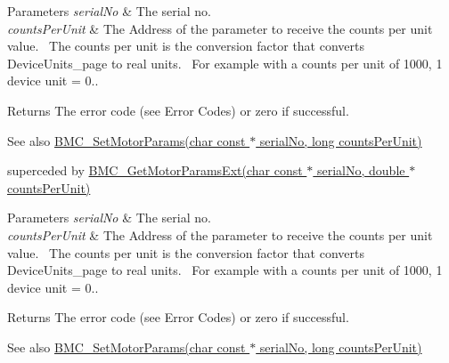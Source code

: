 \begin{DoxyParams}{Parameters}
{\em serial\+No} & The serial no. \\
\hline
{\em counts\+Per\+Unit} & The Address of the parameter to receive the counts per unit value.~\newline
 The counts per unit is the conversion factor that converts Device\+Units\+\_\+page to real units.~\newline
 For example with a counts per unit of 1000, 1 device unit = 0.\+0001mm. \\
\hline
\end{DoxyParams}
\begin{DoxyReturn}{Returns}
The error code (see Error Codes) or zero if successful. 
\end{DoxyReturn}
\begin{DoxySeeAlso}{See also}
\hyperlink{group___t_cube_brushless_motor_ga86b00f1ab58bd5fc678d2babc494144f}{B\+M\+C\+\_\+\+Set\+Motor\+Params(char const $\ast$ serial\+No, long counts\+Per\+Unit)}


\end{DoxySeeAlso}


superceded by \hyperlink{group___t_cube_brushless_motor_ga2b064be802e7e19b1189d808c703e379}{B\+M\+C\+\_\+\+Get\+Motor\+Params\+Ext(char const $\ast$ serial\+No, double $\ast$counts\+Per\+Unit)} 


\begin{DoxyParams}{Parameters}
{\em serial\+No} & The serial no. \\
\hline
{\em counts\+Per\+Unit} & The Address of the parameter to receive the counts per unit value.~\newline
 The counts per unit is the conversion factor that converts Device\+Units\+\_\+page to real units.~\newline
 For example with a counts per unit of 1000, 1 device unit = 0.\+0001mm. \\
\hline
\end{DoxyParams}
\begin{DoxyReturn}{Returns}
The error code (see Error Codes) or zero if successful. 
\end{DoxyReturn}
\begin{DoxySeeAlso}{See also}
\hyperlink{group___t_cube_brushless_motor_ga86b00f1ab58bd5fc678d2babc494144f}{B\+M\+C\+\_\+\+Set\+Motor\+Params(char const $\ast$ serial\+No, long counts\+Per\+Unit)}


\end{DoxySeeAlso}


